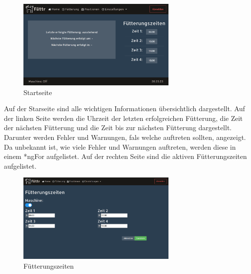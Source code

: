 \begin{figure}
\vspace{-10pt}
  \begin{center}
    \includegraphics[width=0.7\textwidth]{Bilder/Greistorfer/Home}
  \end{center}
  \caption{Startseite}
  \label{Startseite}
  \vspace{-10pt}
\end{figure}

Auf der Starseite sind alle wichtigen Informationen übersichtlich dargestellt. Auf der linken Seite werden die Uhrzeit der letzten erfolgreichen Fütterung, die Zeit der nächsten Fütterung und die Zeit bis zur nächsten Fütterung dargestellt. Darunter werden Fehler und Warnungen, fals welche auftreten sollten, angezeigt. Da unbekannt ist, wie viele Fehler und Warnungen auftreten, werden diese in einem *ngFor aufgelistet. Auf der rechten Seite sind die aktiven Fütterungszeiten aufgelistet. \\

\begin{figure}
\vspace{-10pt}
  \begin{center}
    \includegraphics[width=0.7\textwidth]{Bilder/Greistorfer/Fuetterungszeiten}
  \end{center}
  \caption{Fütterungszeiten}
  \label{Fütterungszeiten}
  \vspace{-10pt}
\end{figure}

